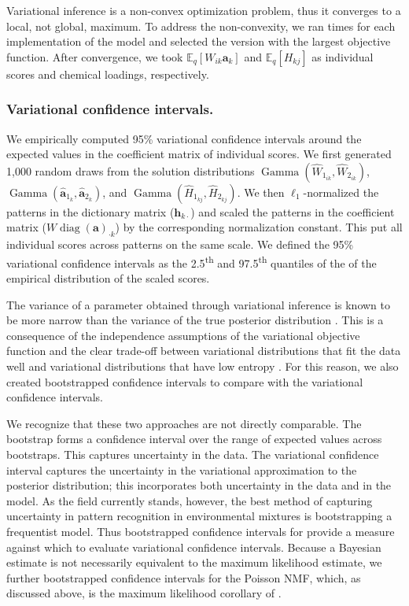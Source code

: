 Variational inference is a non-convex optimization problem, thus it converges to a local, not global, maximum. To address the non-convexity, we ran  times for each implementation of the model and selected the version with the largest objective function. After convergence, we took $\mathbb{E}_{q}\left[W_{i k}\mathbf{a}_{k}\right]$ and $\mathbb{E}_{q}\left[H_{k j}\right]$ as individual scores and chemical loadings, respectively.

\subsubsection{Variational confidence intervals.}
\label{methods_vci}
We empirically computed 95\% variational confidence intervals around the expected values in the coefficient matrix of individual scores. We first generated 1,000 random draws from the solution distributions $\operatorname{Gamma}(\hat{W}_{1_{i k}}, \hat{W}_{2_{i k}})$, $\operatorname{Gamma}(\hat{\mathbf{a}}_{1_k}, \hat{\mathbf{a}}_{2_k})$, and $\operatorname{Gamma}(\hat{H}_{1_{k j}}, \hat{H}_{2_{k j}})$. We then $\ell_1$-normalized the patterns in the dictionary matrix ($\mathbf{h}_{k \cdot}$) and scaled the patterns in the coefficient matrix ($W\operatorname{diag}(\mathbf{a})_{\cdot k}$) by the corresponding normalization constant. This put all individual scores across patterns on the same scale. We defined the 95\% variational confidence intervals as the 2.5\textsuperscript{th} and 97.5\textsuperscript{th} quantiles of the of the empirical distribution of the scaled scores.

The variance of a parameter obtained through variational inference is known to be more narrow than the variance of the true posterior distribution \citep{svensen2005robust}. This is a consequence of the independence assumptions of the variational objective function and the clear trade-off between variational distributions that fit the data well and variational distributions that have low entropy \citep{blei2017variational}. For this reason, we also created bootstrapped confidence intervals to compare with the variational confidence intervals. 

We recognize that these two approaches are not directly comparable. The bootstrap forms a confidence interval over the range of expected values across bootstraps. This captures uncertainty in the data. The variational confidence interval captures the uncertainty in the variational approximation to the posterior distribution; this incorporates both uncertainty in the data and in the model. As the field currently stands, however, the best method of capturing uncertainty in pattern recognition in environmental mixtures is bootstrapping a frequentist model. Thus bootstrapped confidence intervals for \bnmf provide a measure against which to evaluate variational confidence intervals. Because a Bayesian estimate is not necessarily equivalent to the maximum likelihood estimate, we further bootstrapped confidence intervals for the Poisson NMF, which, as discussed above, is the maximum likelihood corollary of \bnmfc.

